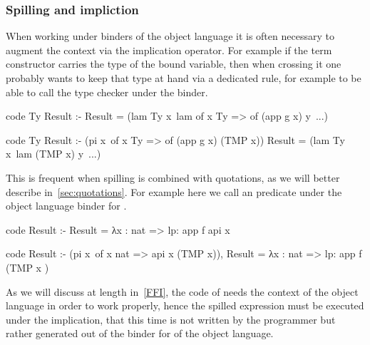 \documentclass[a4paper, 11pt]{book}
\begin{document}


\subsubsection{Spilling and impliction}

When working under binders of the object language it is often
necessary to augment the context via
the implication operator. For example if the 
term constructor carries the type of the bound variable, then when
crossing it one probably wants to keep that type at hand via
a dedicated rule, for example to be able to call the type
checker under the binder.

\begin{elpicode}
  code Ty Result :- 
    Result = (lam Ty x\ lam {of x Ty => of (app g x)} y\ ...)

  code Ty Result :-
    (pi x\ of x Ty => of (app g x) (TMP x))
    Result = (lam Ty x\ lam (TMP x) y\ ...)
\end{elpicode}

\noindent
This is frequent when spilling is combined with quotations, as we
will better describe in~\cref{sec:quotations}. For example
here we call an predicate  under the object language binder
for .

\begin{elpicode}
  code Result :-
    Result = {{ λx : nat => lp:{{ app f {api x}  }}  }}

  code Result :-
    (pi x\ of x {{ nat }} => api x (TMP x)),
    Result = {{ λx : nat => lp:{{ app f (TMP {{ x }})  }}  }}
\end{elpicode}

\noindent
As we will discuss at length in~\cref{FFI}, the code of  needs the
context of the object language in order to work properly, hence the
spilled expression must be executed under the implication, that this time
is not written by the programmer but rather generated out of the binder
for  of the object language.
\end{document}
